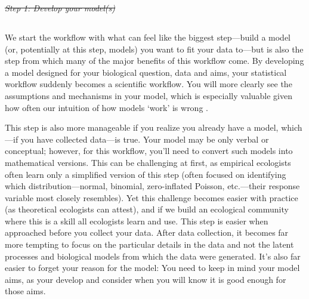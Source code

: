 \documentclass[11pt]{article}
\providecommand{\DIFaddtex}[1]{{\protect\color{blue}\uwave{#1}}} %
\providecommand{\DIFdeltex}[1]{{\protect\color{red}\sout{#1}}}                      %
\providecommand{\DIFaddbegin}{} %
\providecommand{\DIFaddend}{} %
\providecommand{\DIFdelbegin}{} %
\providecommand{\DIFdelend}{} %
\providecommand{\DIFadd}[1]{\texorpdfstring{\DIFaddtex{#1}}{#1}} %
\providecommand{\DIFdel}[1]{\texorpdfstring{\DIFdeltex{#1}}{}} %
\newcommand{\DIFscaledelfig}{0.5}
\newlength{\DIFdelgraphicswidth} %
\newlength{\DIFdelgraphicsheight} %
\newcommand{\DIFaddincludegraphics}[2][]{{\color{blue}\fbox{\DIFOincludegraphics[#1]{#2}}}} %
\newcommand{\DIFdelincludegraphics}[2][]{%
\sbox{\DIFdelgraphicsbox}{\DIFOincludegraphics[#1]{#2}}%
\settoboxwidth{\DIFdelgraphicswidth}{\DIFdelgraphicsbox} %
\settoboxtotalheight{\DIFdelgraphicsheight}{\DIFdelgraphicsbox} %
\scalebox{\DIFscaledelfig}{%
\parbox[b]{\DIFdelgraphicswidth}{\usebox{\DIFdelgraphicsbox}\\[-\baselineskip] \rule{\DIFdelgraphicswidth}{0em}}\llap{\resizebox{\DIFdelgraphicswidth}{\DIFdelgraphicsheight}{%
\setlength{\unitlength}{\DIFdelgraphicswidth}%
\begin{picture}(1,1)%
\thicklines\linethickness{2pt} %
{\color[rgb]{1,0,0}\put(0,0){\framebox(1,1){}}}%
{\color[rgb]{1,0,0}\put(0,0){\line( 1,1){1}}}%
{\color[rgb]{1,0,0}\put(0,1){\line(1,-1){1}}}%
\end{picture}%
}\hspace*{3pt}}} %
} %
\DeclareRobustCommand{\DIFaddbegin}{\DIFOaddbegin \let\includegraphics\DIFaddincludegraphics} %
\DeclareRobustCommand{\DIFaddend}{\DIFOaddend \let\includegraphics\DIFOincludegraphics} %
\DeclareRobustCommand{\DIFdelbegin}{\DIFOdelbegin \let\includegraphics\DIFdelincludegraphics} %
\DeclareRobustCommand{\DIFdelend}{\DIFOaddend \let\includegraphics\DIFOincludegraphics} %
\begin{document}
\DIFdelbegin \emph{\DIFdel{Step 1: Develop your model(s)}} 
\DIFdelend \DIFaddbegin \subsection{\DIFadd{Step 1: Develop your model(s)}} 
\DIFaddend 

We start the workflow with what can feel like the biggest step---build a model (or, potentially at this step, models) you want to fit your data to---but is also the step from which many of the major benefits of this workflow come. By developing a model designed for your biological question, data and aims, your statistical workflow suddenly becomes a scientific workflow. You will more clearly see the assumptions and mechanisms in your model, which is especially valuable given how often our intuition of how models `work' is wrong \citep{kokko2005useful}.  

This step is also more manageable if you realize you already have a model, which---if you have collected data---is true. Your model may be only verbal or conceptual; however, for this workflow, you’ll need to convert such models into mathematical versions. This can be challenging at first, as empirical ecologists often learn only a simplified version of this step (often focused on identifying which distribution---normal, binomial, zero-inflated Poisson, etc.---their response variable most closely resembles). Yet this challenge becomes easier with practice (as theoretical ecologists can attest), and if we build an ecological community where this is a skill all ecologists learn and use. This step is easier when approached before you collect your data. After data collection, it becomes far more tempting to focus on the particular details in the data and not the latent processes and biological models from which the data were generated. It's also far easier to forget your reason for the model: You  need to keep in mind your model aims, as your develop and consider when you will know it is good enough for those aims. 
\end{document}
